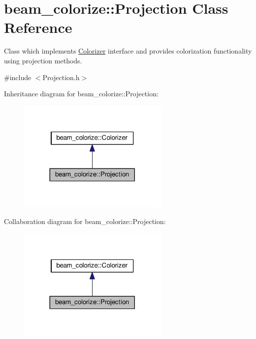 \hypertarget{classbeam__colorize_1_1_projection}{}\section{beam\+\_\+colorize\+:\+:Projection Class Reference}
\label{classbeam__colorize_1_1_projection}


Class which implements \hyperlink{classbeam__colorize_1_1_colorizer}{Colorizer} interface and provides colorization functionality using projection methods.  




{\ttfamily \#include $<$Projection.\+h$>$}



Inheritance diagram for beam\+\_\+colorize\+:\+:Projection\+:\nopagebreak
\begin{figure}[H]
\begin{center}
\leavevmode
\includegraphics[width=209pt]{classbeam__colorize_1_1_projection__inherit__graph}
\end{center}
\end{figure}


Collaboration diagram for beam\+\_\+colorize\+:\+:Projection\+:\nopagebreak
\begin{figure}[H]
\begin{center}
\leavevmode
\includegraphics[width=209pt]{classbeam__colorize_1_1_projection__coll__graph}
\end{center}
\end{figure}
